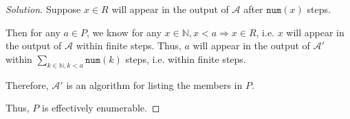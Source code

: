 \documentclass{article}
\newenvironment{solution}{\begin{proof}[\noindent\it Solution]}{\end{proof}}
\begin{document}
\begin{solution}
    \hspace{1.3em}
    Suppose $x\in R$ will appear in the output of $\mathcal{A}$ after $\mathtt{num}(x)$ steps. 

    \hspace{1.3em}
    Then for any $a\in P$, we know for any $x\in\mathbb{N}, x<a \Rightarrow x\in R$, i.e. $x$ will appear in the output of $\mathcal{A}$ within finite steps. Thus, $a$ will appear in the output of $\mathcal{A'}$ within $\sum_{k\in\mathbb{N},k<a}\mathtt{num}(k)$ steps, i.e. within finite steps.

    \hspace{1.3em}
    Therefore, $\mathcal{A'}$ is an algorithm for listing the members in $P$.

    \hspace{1.3em}
    Thus, $P$ is effectively enumerable.
\end{solution}
\end{document}
